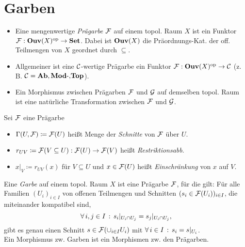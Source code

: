 \documentclass{cheat-sheet}
\begin{document}
\section{Garben}



\begin{defn}
  \begin{itemize}
    \item Eine mengenwertige \emph{Prägarbe} $\mathcal{F}$ auf einem topol. Raum $X$ ist ein Funktor
    $\mathcal{F} : \mathbf{Ouv}(X)^{\mathrm{op}} \to \mathbf{Set}$.
    Dabei ist $\mathbf{Ouv}(X)$ die Präordnungs-Kat. der off. Teilmengen von $X$ geordnet durch $\subseteq$.
    \item Allgemeiner ist eine $\mathcal{C}$-wertige Prägarbe ein Funktor $\mathcal{F} : \mathbf{Ouv}(X)^{\mathrm{op}} \to \mathcal{C}$ (z.\,B. $\mathcal{C} = \mathbf{Ab}, \mathbf{Mod}\text{-}{,} \mathbf{Top}$).
    \item Ein Morphismus zwischen Prägarben $\mathcal{F}$ und $\mathcal{G}$ auf demselben topol. Raum ist eine natürliche Transformation zwischen $\mathcal{F}$ und $\mathcal{G}$.
  \end{itemize}
\end{defn}

\begin{nota}
  Sei $\mathcal{F}$ eine Prägarbe
  \begin{itemize}
    \item $\Gamma(U, \mathcal{F}) \coloneqq \mathcal{F}(U)$ heißt Menge der \emph{Schnitte} von $\mathcal{F}$ über $U$.
    \item $r_{UV} \coloneqq \mathcal{F}(V \subseteq U) : \mathcal{F}(U) \to \mathcal{F}(V)$ heißt \emph{Restriktionsabb}.
    \item $x|_V \coloneqq r_{UV}(x)$ für $V \subseteq U$ und $x \in \mathcal{F}(U)$ heißt \emph{Einschränkung} von $x$ auf $V$.
  \end{itemize}
\end{nota}

\begin{defn}
  Eine \emph{Garbe} auf einem topol. Raum $X$ ist eine Prägarbe $\mathcal{F}$, für die gilt:
  Für alle Familien $(U_i)_{i \in I}$ von offenen Teilmengen und Schnitten $(s_i \in \mathcal{F}(U_i))_{i \in I}$, die miteinander kompatibel sind, \dh{}
  \[ \forall \, {i, j \in I} \,:\, s_i|_{U_i \cap U_j} = s_j|_{U_i \cap U_j}, \]
  gibt es genau einen Schnitt $s \in \mathcal{F}(\cup_{i \in I} U_i)$ mit $\forall \, {i \in I} \,:\, s_i = s|_{U_i}$.\\
  Ein Morphismus zw. Garben ist ein Morphismen zw. den Prägarben.
\end{defn}
\end{document}
